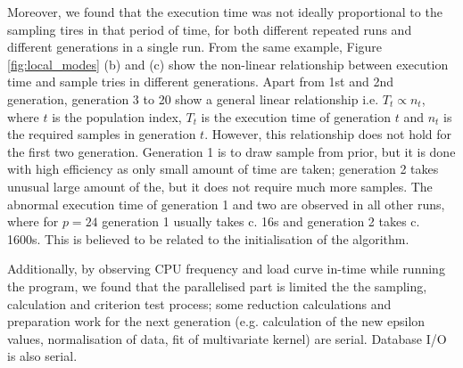 Moreover, we found that the execution time was not ideally proportional to the sampling tires in that period of time, for both different repeated runs and different generations in a single run. From the same example, Figure \ref{fig:local_modes} (b) and (c) show the non-linear relationship between execution time and sample tries in different generations. Apart from 1st and 2nd generation, generation 3 to 20 show a general linear relationship i.e. $T_t\propto n_t$, where $t$ is the population index, $T_t$ is the execution time of generation $t$ and $n_t$ is the required samples in generation $t$. However, this relationship does not hold for the first two generation. Generation 1 is to draw sample from prior, but it is done with high efficiency as only small amount of time are taken; generation 2 takes unusual large amount of the, but it does not require much more samples. The abnormal execution time of generation 1 and two are observed in all other runs, where for $p=24$ generation 1 usually takes c. 16s and generation 2 takes c. 1600s. This is believed to be related to the initialisation of the algorithm. 

Additionally, by observing CPU frequency and load curve in-time while running the program, we found that the parallelised part is limited the the sampling, calculation and criterion test process; some reduction calculations and preparation work for the next generation (e.g. calculation of the new epsilon values, normalisation of data, fit of multivariate kernel) are serial. Database I/O is also serial.





